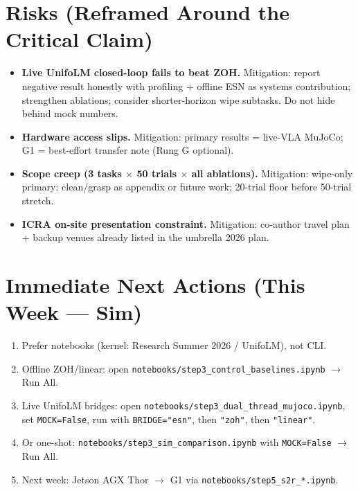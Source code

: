 \documentclass[conference]{IEEEtran}
\begin{document}
\section{Risks (Reframed Around the Critical Claim)}
\begin{itemize}
    \item \textbf{Live UnifoLM closed-loop fails to beat ZOH.}
        Mitigation: report negative result honestly with profiling + offline ESN as systems contribution; strengthen ablations; consider shorter-horizon wipe subtasks.
        Do not hide behind mock numbers.
    \item \textbf{Hardware access slips.}
        Mitigation: primary results = live-VLA MuJoCo; G1 = best-effort transfer note (Rung G optional).
    \item \textbf{Scope creep (3 tasks $\times$ 50 trials $\times$ all ablations).}
        Mitigation: wipe-only primary; clean/grasp as appendix or future work; 20-trial floor before 50-trial stretch.
    \item \textbf{ICRA on-site presentation constraint.}
        Mitigation: co-author travel plan + backup venues already listed in the umbrella 2026 plan.
\end{itemize}

\section{Immediate Next Actions (This Week — Sim)}
\begin{enumerate}
    \item Prefer notebooks (kernel: Research Summer 2026 / UnifoLM), not CLI.
    \item Offline ZOH/linear: open \texttt{notebooks/step3\_control\_baselines.ipynb} $\to$ Run All.
    \item Live UnifoLM bridges: open \texttt{notebooks/step3\_dual\_thread\_mujoco.ipynb},
          set \texttt{MOCK=False}, run with \texttt{BRIDGE="esn"}, then \texttt{"zoh"}, then \texttt{"linear"}.
    \item Or one-shot: \texttt{notebooks/step3\_sim\_comparison.ipynb} with \texttt{MOCK=False} $\to$ Run All.
    \item Next week: Jetson AGX Thor $\to$ G1 via \texttt{notebooks/step5\_s2r\_*.ipynb}.
\end{enumerate}

\balance
\end{document}

